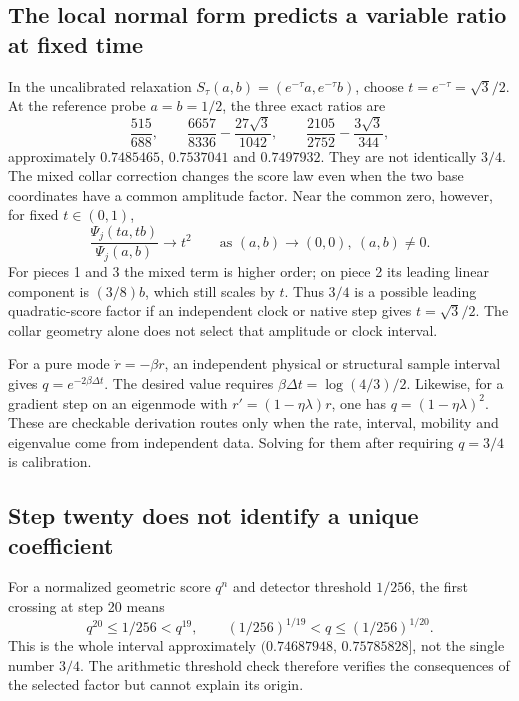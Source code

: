 \documentclass[11pt,a4paper]{article}
\begin{document}
\subsection{The local normal form predicts a variable ratio at fixed time}
In the uncalibrated relaxation $S_\tau(a,b)=(e^{-\tau}a,e^{-\tau}b)$,
choose $t=e^{-\tau}=\sqrt3/2$. At the reference probe $a=b=1/2$,
the three exact ratios are
\[
\frac{515}{688},\qquad
\frac{6657}{8336}-\frac{27\sqrt3}{1042},\qquad
\frac{2105}{2752}-\frac{3\sqrt3}{344},
\]
approximately $0.7485465$, $0.7537041$ and $0.7497932$.
They are not identically $3/4$. The mixed collar correction changes the
score law even when the two base coordinates have a common amplitude factor.
Near the common zero, however, for fixed $t\in(0,1)$,
\[
\frac{\Psi_j(ta,tb)}{\Psi_j(a,b)}\longrightarrow t^2
\qquad\text{as }(a,b)\to(0,0),\ (a,b)\ne0.
\]
For pieces 1 and 3 the mixed term is higher order; on piece 2 its leading
linear component is $(3/8)b$, which still scales by $t$.
Thus $3/4$ is a possible leading quadratic-score factor if an independent
clock or native step gives $t=\sqrt3/2$. The collar geometry alone does
not select that amplitude or clock interval.

For a pure mode $\dot r=-\beta r$, an independent physical or structural
sample interval gives $q=e^{-2\beta\Delta t}$. The desired value requires
$\beta\Delta t=\log(4/3)/2$. Likewise, for a gradient step on an
eigenmode with $r'=(1-\eta\lambda)r$, one has
$q=(1-\eta\lambda)^2$. These are checkable derivation routes only when
the rate, interval, mobility and eigenvalue come from independent data.
Solving for them after requiring $q=3/4$ is calibration.

\subsection{Step twenty does not identify a unique coefficient}
For a normalized geometric score $q^n$ and detector threshold $1/256$,
the first crossing at step 20 means
\[
q^{20}\le1/256<q^{19},
\qquad (1/256)^{1/19}<q\le(1/256)^{1/20}.
\]
This is the whole interval approximately
$(0.74687948,\,0.75785828]$, not the single number $3/4$.
The arithmetic threshold check therefore verifies the consequences of
the selected factor but cannot explain its origin.
\end{document}
